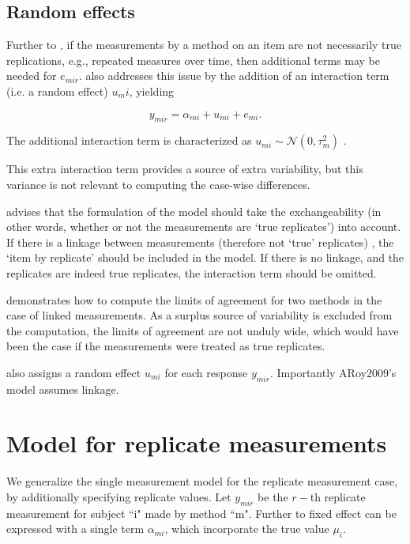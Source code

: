 \documentclass[12pt, a4paper]{report}
\theoremstyle{plain}
\theoremstyle{definition}
\theoremstyle{remark}
\begin{document}
	\subsection{Random effects}
	
	Further to \citet{barnhart}, if the measurements by a method on an item are not necessarily true replications, e.g., repeated measures over time, then additional terms may be needed for $e_{mir}$. \citet{BXC2008} also addresses this issue by the addition of an interaction term (i.e. a random effect) $u_mi$, yielding
	
	\[ y_{mir} =  \alpha_{mi} + u_{mi} + e_{mi}.  \]
	
	The additional interaction term is characterized as $u_{mi}  \sim \mathcal{N}(0, \tau^2_m)$ \citep{BXC2008}.
	
	This extra interaction term provides a source of extra variability, but this variance is not relevant to computing the case-wise differences.
	
	\citet{BXC2008} advises that the formulation of the model should take the exchangeability (in other words, whether or not the measurements are `true replicates') into account. If there is a linkage between measurements (therefore not `true' replicates) , the `item by replicate' should be included in the model. If there is no linkage, and the replicates are indeed true replicates, the interaction term should be omitted.
	
	\citet{BXC2008} demonstrates how to compute the limits of agreement for two methods in the case of linked measurements. As a surplus source of variability is excluded from the computation, the limits of agreement are not unduly wide, which would have been the case if the measurements were treated as true replicates.
	
	\citet{ARoy2009} also assigns a random effect $u_{mi}$ for each response $y_{mir}$. Importantly ARoy2009's model assumes linkage.
	
	\section{Model for replicate measurements}
	
	We generalize the single measurement model for the replicate measurement case, by additionally specifying replicate values. Let $y_{mir}$ be the $r-$th replicate measurement for subject ``i" made by method ``m". Further to \citet{barnhart} fixed effect can be expressed with a single term $\alpha_{mi}$, which incorporate the true value $\mu_i$.
	
\end{document}
